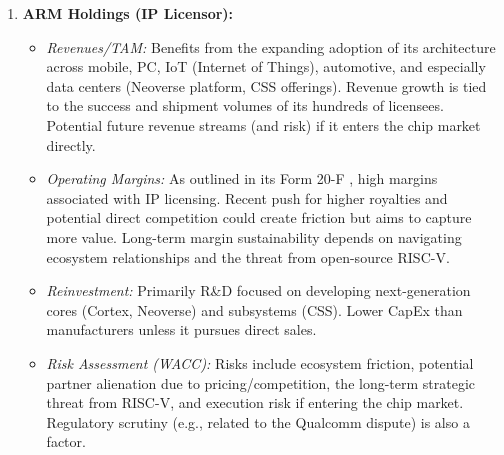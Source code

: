 \begin{enumerate}
    \item \textbf{ARM Holdings (IP Licensor):}
          \begin{itemize}
              \item \textit{Revenues/TAM:} Benefits from the expanding adoption of its architecture across mobile, PC, IoT (Internet of Things), automotive, and especially data centers (Neoverse platform, CSS offerings). Revenue growth is tied to the success and shipment volumes of its hundreds of licensees. Potential future revenue streams (and risk) if it enters the chip market directly.
              \item \textit{Operating Margins:} As outlined in its Form 20-F \parencite{arm202420f}, high margins associated with IP licensing. Recent push for higher royalties and potential direct competition could create friction but aims to capture more value. Long-term margin sustainability depends on navigating ecosystem relationships and the threat from open-source RISC-V.
              \item \textit{Reinvestment:} Primarily R\&D focused on developing next-generation cores (Cortex, Neoverse) and subsystems (CSS). Lower CapEx than manufacturers unless it pursues direct sales.
              \item \textit{Risk Assessment (WACC):} Risks include ecosystem friction, potential partner alienation due to pricing/competition, the long-term strategic threat from RISC-V, and execution risk if entering the chip market. Regulatory scrutiny (e.g., related to the Qualcomm dispute) is also a factor.
          \end{itemize}


\end{enumerate}
